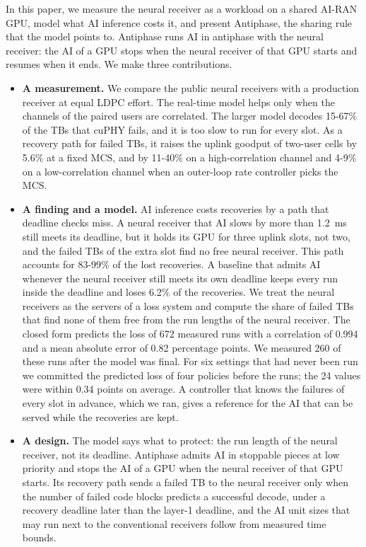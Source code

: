 \documentclass[acmsmall,screen,review,anonymous]{acmart}
\newcommand{\sys}{Antiphase\xspace}
\begin{document}
In this paper, we measure the neural receiver as a workload on a shared AI-RAN GPU, model what AI inference
costs it, and present \sys, the sharing rule that the model points to. \sys runs AI in antiphase with the
neural receiver: the AI of a GPU stops when the neural receiver of that GPU starts and resumes when it ends.
We make three contributions.
\begin{itemize}
\item \textbf{A measurement.} We compare the public neural receivers with a production receiver at equal
LDPC effort. The real-time model helps only when the channels of the paired users are correlated. The larger
model decodes 15-67\% of the TBs that cuPHY fails, and it is too slow to run for every slot. As a recovery
path for failed TBs, it raises the uplink goodput of two-user cells by 5.6\% at a fixed MCS, and by 11-40\%
on a high-correlation channel and 4-9\% on a low-correlation channel when an outer-loop rate controller picks
the MCS.
\item \textbf{A finding and a model.} AI inference costs recoveries by a path that deadline checks miss. A
neural receiver that AI slows by more than 1.2~ms still meets its deadline, but it holds its GPU for three
uplink slots, not two, and the failed TBs of the extra slot find no free neural receiver. This path accounts
for 83-99\% of the lost recoveries. A baseline that admits AI whenever the neural receiver still meets its own
deadline keeps every run inside the deadline and loses 6.2\% of the recoveries. We treat the neural receivers as the servers of a loss system and
compute the share of failed TBs that find none of them free from the run lengths of the neural receiver. The
closed form predicts the loss of 672 measured runs with a correlation of 0.994 and a mean absolute error of
0.82 percentage points. We measured 260 of these runs after the model was final. For six settings that had never
been run we committed the predicted loss of four policies before the runs; the 24 values were within 0.34
points on average. A controller that knows the failures of every slot in advance, which we ran, gives a
reference for the AI that can be served while the recoveries are kept.
\item \textbf{A design.} The model says what to protect: the run length of the neural receiver, not its
deadline. \sys admits AI in stoppable pieces at low priority and stops the AI of a GPU when the neural
receiver of that GPU starts. Its recovery path sends a failed TB to the neural receiver only when the number
of failed code blocks predicts a successful decode, under a recovery deadline later than the layer-1
deadline, and the AI unit sizes that may run next to the conventional receivers follow from measured time
bounds.
\end{itemize}
\end{document}
